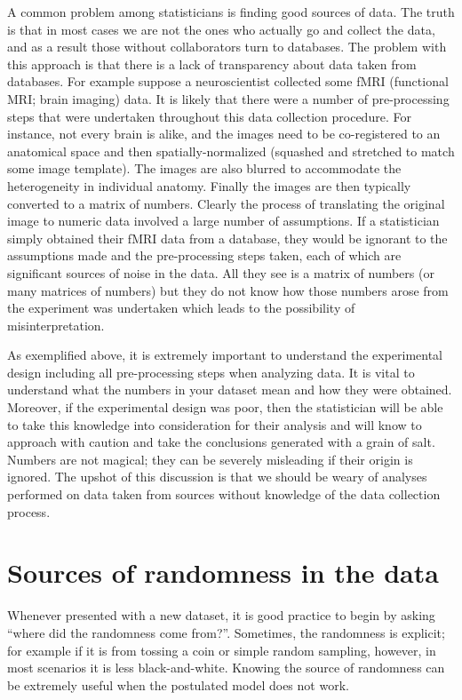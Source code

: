 A common problem among statisticians is finding good sources of data. The truth is that in most cases we are not the ones who actually go and collect the data, and as a result those without collaborators turn to databases. The problem with this approach is that there is a lack of transparency about data taken from databases. For example suppose a neuroscientist collected some fMRI (functional MRI; brain imaging) data. It is likely that there were a number of pre-processing steps that were undertaken throughout this data collection procedure. For instance, not every brain is alike, and the images need to be co-registered to an anatomical space and then spatially-normalized (squashed and stretched to match some image template). The images are also blurred to accommodate the heterogeneity in individual anatomy. Finally the images are then typically converted to a matrix of numbers. Clearly the process of translating the original image to numeric data involved a large number of assumptions. If a statistician simply obtained their fMRI data from a database, they would be ignorant to the assumptions made and the pre-processing steps taken, each of which are significant sources of noise in the data. All they see is a matrix of numbers (or many matrices of numbers) but they do not know how those numbers arose from the experiment was undertaken which leads to the possibility of misinterpretation.

As exemplified above, it is extremely important to understand the experimental design including all pre-processing steps when analyzing data. It is vital to understand what the numbers in your dataset mean and how they were obtained. Moreover, if the experimental design was poor, then the statistician will be able to take this knowledge into consideration for their analysis and will know to approach with caution and take the conclusions generated with a grain of salt. Numbers are not magical; they can be severely misleading if their origin is ignored. The upshot of this discussion is that we should be weary of analyses performed on data taken from sources without knowledge of the data collection process.




\section{Sources of randomness in the data}

Whenever presented with a new dataset, it is good practice to begin by asking ``where did the randomness come from?''. Sometimes, the randomness is explicit; for example if it is from tossing a coin or simple random sampling, however, in most scenarios it is less black-and-white. Knowing the source of randomness can be extremely useful when the postulated model does not work.

